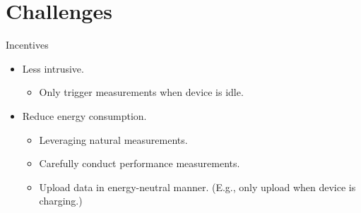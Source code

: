 \section{Challenges}

\begin{frame}{Incentives}
  \begin{itemize}
    \item Less intrusive.
      \begin{itemize}
        \item Only trigger measurements when device is idle.
      \end{itemize}
    \item Reduce energy consumption.
      \begin{itemize}
        \item Leveraging natural measurements.
        \item Carefully conduct performance measurements.
        \item Upload data in energy-neutral manner. (E.g., only upload when device is charging.)
      \end{itemize}
  \end{itemize}
\end{frame}

